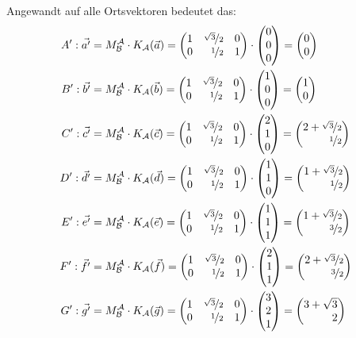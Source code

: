 \documentclass[answers]{exam}
\newcommand{\vektor}[1]{\begin{pmatrix*}[r] #1 \end{pmatrix*}}
\newcommand{\A}{\mathcal{A}}
\newcommand{\B}{\mathcal{B}}
\begin{document}
\begin{questions}
\begin{parts}
\begin{solution}
            Angewandt auf alle Ortsvektoren bedeutet das:
            $$
                \begin{aligned}
                    A': \vec{a'} & = M^\A_\B \cdot K_{\A}(\vec{a}) = \vektor{1 & \nicefrac{\sqrt{3}}{2} & 0 \\ 0 & \nicefrac{1}{2} & 1} \cdot \vektor{0 \\ 0 \\ 0} = \vektor{0 \\ 0} \\
                    B': \vec{b'} & = M^\A_\B \cdot K_{\A}(\vec{b}) = \vektor{1 & \nicefrac{\sqrt{3}}{2} & 0 \\ 0 & \nicefrac{1}{2} & 1} \cdot \vektor{1 \\ 0 \\ 0} = \vektor{1 \\ 0} \\
                    C': \vec{c'} & = M^\A_\B \cdot K_{\A}(\vec{c}) = \vektor{1 & \nicefrac{\sqrt{3}}{2} & 0 \\ 0 & \nicefrac{1}{2} & 1} \cdot \vektor{2 \\ 1 \\ 0} = \vektor{2+\nicefrac{\sqrt{3}}{2} \\ \nicefrac{1}{2}} \\
                    D': \vec{d'} & = M^\A_\B \cdot K_{\A}(\vec{d}) = \vektor{1 & \nicefrac{\sqrt{3}}{2} & 0 \\ 0 & \nicefrac{1}{2} & 1} \cdot \vektor{1 \\ 1 \\ 0} = \vektor{1+\nicefrac{\sqrt{3}}{2} \\ \nicefrac{1}{2}} \\
                    E': \vec{e'} & = M^\A_\B \cdot K_{\A}(\vec{e}) = \vektor{1 & \nicefrac{\sqrt{3}}{2} & 0 \\ 0 & \nicefrac{1}{2} & 1} \cdot \vektor{1 \\ 1 \\ 1} = \vektor{1+\nicefrac{\sqrt{3}}{2} \\ \nicefrac{3}{2}} \\
                    F': \vec{f'} & = M^\A_\B \cdot K_{\A}(\vec{f}) = \vektor{1 & \nicefrac{\sqrt{3}}{2} & 0 \\ 0 & \nicefrac{1}{2} & 1} \cdot \vektor{2 \\ 1 \\ 1} = \vektor{2+\nicefrac{\sqrt{3}}{2} \\ \nicefrac{3}{2}} \\
                    G': \vec{g'} & = M^\A_\B \cdot K_{\A}(\vec{g}) = \vektor{1 & \nicefrac{\sqrt{3}}{2} & 0 \\ 0 & \nicefrac{1}{2} & 1} \cdot \vektor{3 \\ 2 \\ 1} = \vektor{3+\sqrt{3} \\ 2} \\

\end{aligned}$$
\end{solution}
\end{parts}
\end{questions}
\end{document}
